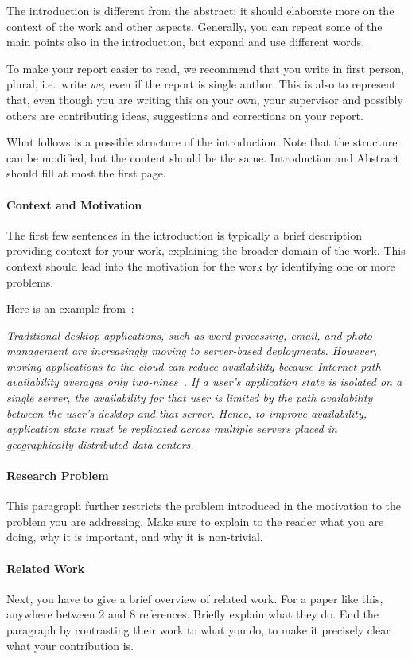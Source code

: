 
\noindent
The introduction is different from the abstract; it should elaborate
more on the context of the work and other aspects. Generally, you can repeat some
of the main points also in the introduction, but expand and use different words.

To make your report easier to read, we recommend that you write in first person,
plural, i.e.~write \textit{we}, even if the report is single author.
This is also to represent that, even though you are writing this on your own,
your supervisor and possibly others are contributing ideas, suggestions and
corrections on your report.

What follows is a possible structure of the introduction.
Note that the structure can be modified, but the content should be the same.
Introduction and Abstract should fill at most the first page.

\paragraph{Context and Motivation} The first few sentences in the introduction
is typically a brief description providing context for your work, explaining
the broader domain of the work. This context should lead into the motivation for
the work by identifying one or more problems. 

Here is an example from~\cite{zorfu}:

\textit{Traditional desktop applications, such as word processing, email, and photo management are increasingly moving to server-based deployments. However, moving applications to the cloud can reduce availability because Internet path availability averages only two-nines~\cite{internetPaths}. If a user's application state is isolated on a single server, the availability for that user is limited by the path availability between the user's desktop and that server. Hence, to improve availability, application state must be replicated across multiple servers placed in geographically distributed data centers.}

\paragraph{Research Problem} This paragraph further restricts the problem introduced in the motivation to the problem you are addressing. 
Make sure to explain to the reader 
what you are doing, why it is important, and why it is non-trivial.

\paragraph{Related Work} Next, you have to give a brief overview
of related work. For a paper like this, anywhere between 2
and 8 references. Briefly explain what they do. End the paragraph by
contrasting their work to what you do, to make it precisely clear what
your contribution is.

